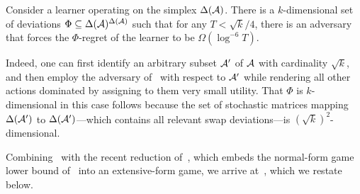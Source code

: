 \begin{corollary}
    \label{cor:parlower}
    Consider a learner operating on the simplex $\Delta({\mathcal{A}})$. There is a $k$-dimensional set of deviations $\Phi \subseteq \Delta({\mathcal{A}})^{\Delta({\mathcal{A}})}$ such that for any $T < \sqrt{k}/4$, there is an adversary that forces the $\Phi$-regret of the learner to be $\Omega(\log^{-6} T)$.
\end{corollary}

Indeed, one can first identify an arbitrary subset ${\mathcal{A}}'$ of ${\mathcal{A}}$ with cardinality $\sqrt{k}$, and then employ the adversary of~ with respect to ${\mathcal{A}}'$ while rendering all other actions dominated by assigning to them very small utility. That $\Phi$ is $k$-dimensional in this case follows because the set of stochastic matrices mapping $\Delta({\mathcal{A}}')$ to $\Delta({\mathcal{A}}')$---which contains all relevant swap deviations---is $(\sqrt{k})^2$-dimensional.

Combining~ with the recent reduction of~\citet{Daskalakis24:Lower}, which embeds the normal-form game lower bound of~ into an extensive-form game, we arrive at~, which we restate below.

\lowerbound*